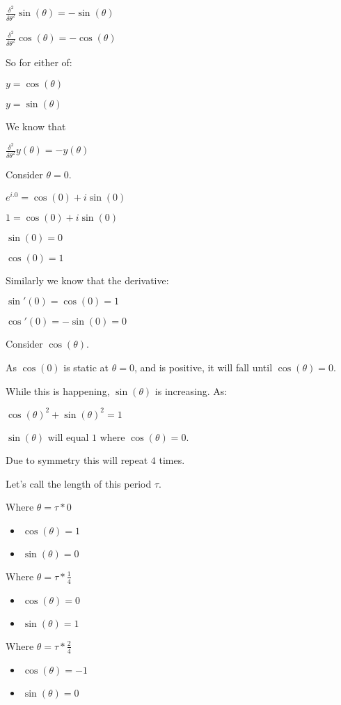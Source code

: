 $\frac{\delta^2 }{\delta \theta^2}\sin (\theta )=-\sin (\theta )$

$\frac{\delta^2 }{\delta \theta^2}\cos (\theta )=-\cos (\theta )$

So for either of:

$y=\cos (\theta )$

$y=\sin (\theta )$

We know that

$\frac{\delta^2 }{\delta \theta^2}y(\theta )=-y(\theta )$

Consider \(\theta =0\).

$e^{i.0}=\cos (0)+i\sin (0)$

$1=\cos (0)+i\sin (0)$

$\sin (0)=0$

$\cos (0)=1$

Similarly we know that the derivative:

$\sin'(0)=\cos(0)=1$

$\cos'(0)=-\sin(0)=0$

Consider \(\cos(\theta )\). 

As \(\cos (0)\) is static at \(\theta =0\), and is positive, it will fall until \(\cos (\theta )=0\).

While this is happening, \(\sin (\theta )\) is increasing. As:

$\cos (\theta )^2+\sin (\theta )^2=1$

\(\sin (\theta )\) will equal \(1\) where \(\cos (\theta )=0\).

Due to symmetry this will repeat \(4\) times.

Let's call the length of this period \(\tau \).

Where \(\theta =\tau *0\)

\begin{itemize}
\item \(\cos (\theta )=1\)
\item \(\sin (\theta )=0\)
\end{itemize}

Where \(\theta =\tau *\frac{1}{4}\)

\begin{itemize}
\item \(\cos (\theta )=0\)
\item \(\sin (\theta )=1\)
\end{itemize}

Where \(\theta =\tau *\frac{2}{4}\)

\begin{itemize}
\item \(\cos (\theta )=-1\)
\item \(\sin (\theta )=0\)
\end{itemize}

